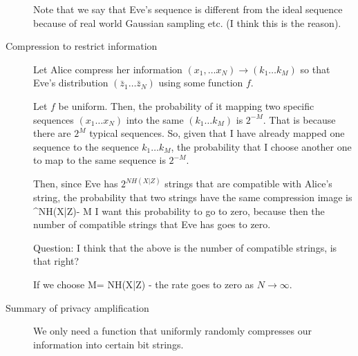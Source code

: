 \begin{description}
Note that we say that Eve's sequence is different from the ideal sequence because of real world Gaussian sampling etc. (I think this is the reason). 

\item[Compression to restrict information] Let Alice compress her information $(x_1, \ldots x_N) \rightarrow (k_1 \ldots k_M)$ so that Eve's distribution $(\bar{z}_1 \ldots \bar{z}_N)$ using some function $f$. 

Let $f$ be uniform. Then, the probability of it mapping two specific sequences $(x_1 \ldots x_N)$ into the same $(k_1 \ldots k_M)$ is $2^{-M}$. That is because there are $2^M$ typical sequences. So, given that I have already mapped one sequence to the sequence $k_1 \ldots k_M$, the probability that I choose another one to map to the same sequence is $2^{-M}$. 

Then, since Eve has $2^{NH(X|Z)}$ strings that are compatible with Alice's string, the probability that two strings have the same compression image is
^{NH(X|Z)- M}
\eeq
I want this probability to go to zero, because then the number of compatible strings that Eve has goes to zero. 

Question: I think that the above is the number of compatible strings, is that right? 

If we choose
\beq
M= NH(X|Z) - 
\eeq
the rate goes to zero as $N \rightarrow \infty$. 

\item[Summary of privacy amplification] We only need a function that uniformly randomly compresses our information into certain bit strings. 

\end{description}
